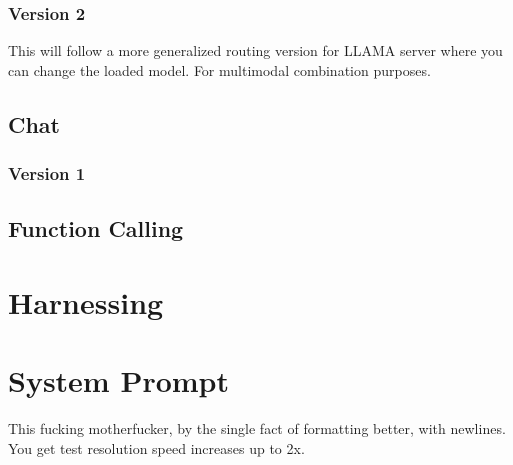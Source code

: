\documentclass[12pt, a4paper, oneside]{report}
\begin{document}
	\subsection{Version 2}

	This will follow a more generalized routing version for LLAMA server where you can change the loaded model.
	For multimodal combination purposes.

	\section{Chat}

	\subsection{Version 1}

	\section{Function Calling}

	\chapter{Harnessing}\label{ch:harnessing}

	\chapter{System Prompt}\label{ch:system_prompt}

	This fucking motherfucker, by the single fact of formatting better, with newlines.
	You get test resolution speed increases up to 2x.
\end{document}
